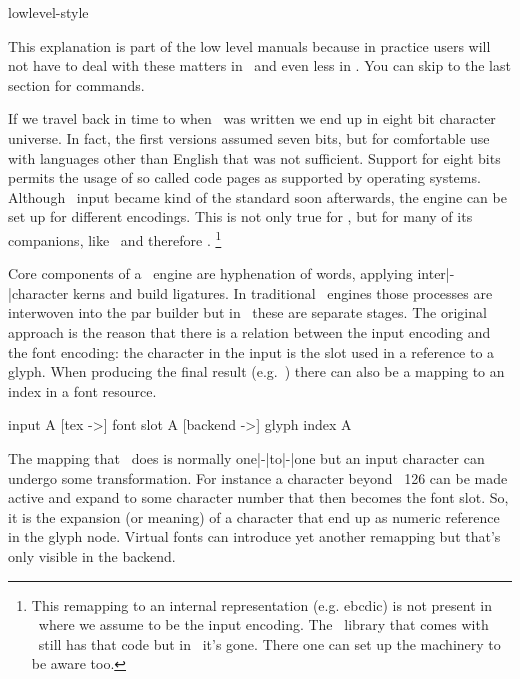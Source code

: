 
\environment lowlevel-style

\startdocument
  [title=characters,
   color=middlered]

\startsectionlevel[title=Introduction]

This explanation is part of the low level manuals because in practice users will
not have to deal with these matters in \MKIV\ and even less in \LMTX. You can
skip to the last section for commands.

\stopsectionlevel

\startsectionlevel[title=History]

If we travel back in time to when \TEX\ was written we end up in eight bit
character universe. In fact, the first versions assumed seven bits, but for
comfortable use with languages other than English that was not sufficient.
Support for eight bits permits the usage of so called code pages as supported by
operating systems. Although \ASCII\ input became kind of the standard soon
afterwards, the engine can be set up for different encodings. This is not only
true for \TEX, but for many of its companions, like \METAFONT\ and therefore
\METAPOST. \footnote {This remapping to an internal representation (e.g. ebcdic)
is not present in \LUATEX\ where we assume  to be the input encoding. The
\METAPOST\ library that comes with \LUATEX\ still has that code but in
\LUAMETATEX\ it's gone. There one can set up the machinery to be  aware
too.}

Core components of a \TEX\ engine are hyphenation of words, applying
inter|-|character kerns and build ligatures. In traditional \TEX\ engines those
processes are interwoven into the par builder but in \LUATEX\ these are separate
stages. The original approach is the reason that there is a relation between the
input encoding and the font encoding: the character in the input is the slot used
in a reference to a glyph. When producing the final result (e.g.\ \PDF) there can
also be a mapping to an index in a font resource.

\starttyping
input A [tex ->] font slot A [backend ->] glyph index A
\stoptyping

The mapping that \TEX\ does is normally one|-|to|-|one but an input character can
undergo some transformation. For instance a character beyond \ASCII\ 126 can be
made active and expand to some character number that then becomes the font slot.
So, it is the expansion (or meaning) of a character that end up as numeric
reference in the glyph node. Virtual fonts can introduce yet another remapping
but that's only visible in the backend.

